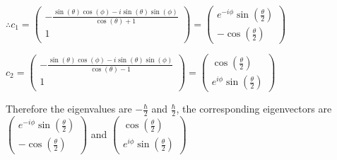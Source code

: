 \documentclass[12pt]{article}
\begin{document}
\begin{spacing}{2.0}
$\therefore c_1=
\left(
\begin{array}{c}
 -\frac{\sin (\theta ) \cos (\phi )-i \sin (\theta ) \sin (\phi )}{\cos (\theta
   )+1} \\
 1 \\
\end{array}
\right)
=\left(
\begin{array}{c}
e^{-i\phi}\sin(\frac{\theta}{2}) \\
-\cos(\frac{\theta}{2}) 
\end{array}
\right)$
 
$c_2=
\left(
\begin{array}{c}
 -\frac{\sin (\theta ) \cos (\phi )-i \sin (\theta ) \sin (\phi )}{\cos (\theta
   )-1} \\
 1 \\
\end{array}
\right)
=\left(
\begin{array}{c}
 \cos(\frac{\theta}{2})\\
 e^{i\phi}\sin(\frac{\theta}{2})
\end{array}
\right)$

Therefore the eigenvalues are $-\frac{\hbar }{2}$ and $\frac{\hbar }{2}$, the corresponding eigenvectors are  
$\left(
\begin{array}{c}
e^{-i\phi}\sin(\frac{\theta}{2}) \\
-\cos(\frac{\theta}{2})
\end{array}
\right)$ and 
$\left(
\begin{array}{c}
 \cos(\frac{\theta}{2})\\
 e^{i\phi}\sin(\frac{\theta}{2})
\end{array}
\right)$

\end{spacing}
\end{document}
